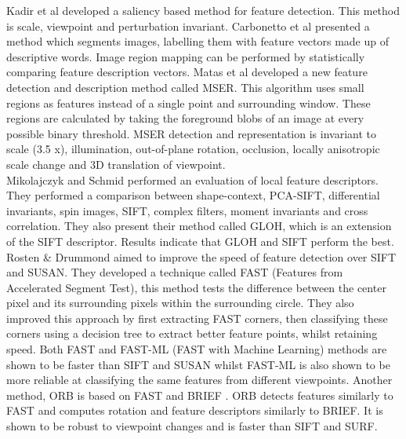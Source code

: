 Kadir et al \cite{Kadir04Affine} developed a saliency based method for feature detection. This method is scale, viewpoint and perturbation invariant. Carbonetto et al \cite{Carbonetto04Statistical} presented a method which segments images, labelling them with feature vectors made up of descriptive words. Image region mapping can be performed by statistically comparing feature description vectors. Matas et al \cite{Matas04Robust} developed a new feature detection and description method called MSER. This algorithm uses small regions as features instead of a single point and surrounding window. These regions are calculated by taking the foreground blobs of an image at every possible binary threshold. MSER detection and representation is invariant to scale (3.5 x), illumination, out-of-plane rotation, occlusion, locally anisotropic scale change and 3D translation of viewpoint. \\

Mikolajczyk and Schmid \cite{Mikolajczyk05Performance} performed an evaluation of local feature descriptors. They performed a comparison between shape-context, PCA-SIFT, differential invariants, spin images, SIFT, complex filters, moment invariants and cross correlation. They also present their method called GLOH, which is an extension of the SIFT descriptor. Results indicate that GLOH and SIFT perform the best. Rosten \& Drummond \cite{Rosten06Machine,Rosten05Fusing} aimed to improve the speed of feature detection over SIFT and SUSAN. They developed a technique called FAST (Features from Accelerated Segment Test), this method tests the difference between the center pixel and its surrounding pixels within the surrounding circle. They also improved this approach by first extracting FAST corners, then classifying these corners using a decision tree to extract better feature points, whilst retaining speed. Both FAST and FAST-ML (FAST with Machine Learning) methods are shown to be faster than SIFT and SUSAN whilst FAST-ML is also shown to be more reliable at classifying the same features from different viewpoints. Another method, ORB \cite{Rublee11Orb} is based on FAST and BRIEF \cite{Calonder10Brief}. ORB detects features similarly to FAST and computes rotation and feature descriptors similarly to BRIEF. It is shown to be robust to viewpoint changes and is faster than SIFT and SURF.  \\ 


